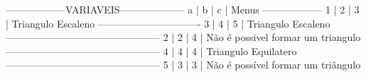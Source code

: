 ------------------VARIAVEIS--------------------
a | b | c | Menus
------------------
1 | 2 | 3 | Triangulo Escaleno
-------------------------------
3 | 4 | 5 | Triangulo Escaleno
-----------------------------------------------
2 | 2 | 4 | Não é possivel formar um triangulo
-----------------------------------------------
4 | 4 | 4 | Triangulo Equilatero
-----------------------------------------------
5 | 3 | 3 | Não é possível formar um triângulo